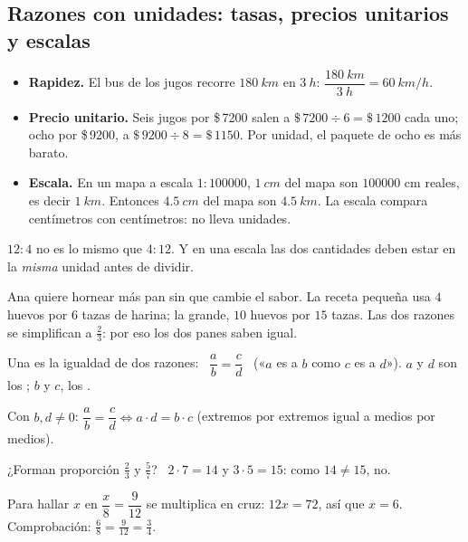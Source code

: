 \documentclass[11pt,a4paper]{article}
\let\nivelzuka\nivel
\renewcommand{\nivel}[2]{\Needspace{8\baselineskip}\nivelzuka{#1}{#2}}
\newcommand{\pesos}[1]{\$\,\num{#1}}
\begin{document}
\subsection{Razones con unidades: tasas, precios unitarios y escalas}
\begin{itemize}
\item \textbf{Rapidez.} El bus de los jugos recorre $\SI{180}{km}$ en $\SI{3}{h}$: $\dfrac{\SI{180}{km}}{\SI{3}{h}}=\SI{60}{km/h}$.
\item \textbf{Precio unitario.} Seis jugos por \pesos{7200} salen a $\pesos{7200}\div6=\pesos{1200}$ cada uno; ocho por \pesos{9200},
      a $\pesos{9200}\div8=\pesos{1150}$. Por unidad, el paquete de ocho es más barato.
\item \textbf{Escala.} En un mapa a escala $1:\num{100000}$, $\SI{1}{cm}$ del mapa son $\num{100000}$ cm reales, es decir $\SI{1}{km}$.
      Entonces $\SI{4.5}{cm}$ del mapa son $\SI{4.5}{km}$. La escala compara centímetros con centímetros: no lleva unidades.
\end{itemize}
\begin{ojo}
$12:4$ no es lo mismo que $4:12$. Y en una escala las dos cantidades deben estar en la \emph{misma} unidad antes de dividir.
\end{ojo}


Ana quiere hornear más pan sin que cambie el sabor. La receta pequeña usa $4$ huevos por $6$ tazas de harina; la grande,
$10$ huevos por $15$ tazas. Las dos razones se simplifican a $\tfrac23$: por eso los dos panes saben igual.

\begin{definicion}[Proporción]
Una  es la igualdad de dos razones: \ $\dfrac ab=\dfrac cd$ \ («$a$ es a $b$ como $c$ es a $d$»).
$a$ y $d$ son los ; $b$ y $c$, los .
\end{definicion}
\begin{propiedad}
Con $b,d\neq0$: \qquad $\dfrac ab=\dfrac cd\iff a\cdot d=b\cdot c$ \qquad (extremos por extremos igual a medios por medios).
\end{propiedad}
\begin{ejemplo}
¿Forman proporción $\tfrac23$ y $\tfrac57$? \ $2\cdot7=14$ y $3\cdot5=15$: como $14\neq15$, no.\par
Para hallar $x$ en $\dfrac x8=\dfrac9{12}$ se multiplica en cruz: $12x=72$, así que $x=6$. Comprobación:
$\tfrac68=\tfrac9{12}=\tfrac34$.
\end{ejemplo}
\end{document}
